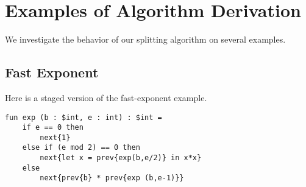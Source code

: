 

\section{Examples of Algorithm Derivation}
\label{sec:examples}

We investigate the behavior of our splitting algorithm on several examples.

 







\subsection{Fast Exponent}

Here is a staged version of the fast-exponent example.
\begin{lstlisting} 
fun exp (b : $int, e : int) : $int =
	if e == 0 then
		next{1}
	else if (e mod 2) == 0 then
		next{let x = prev{exp(b,e/2)} in x*x}
	else
		next{prev{b} * prev{exp (b,e-1)}}
\end{lstlisting}

